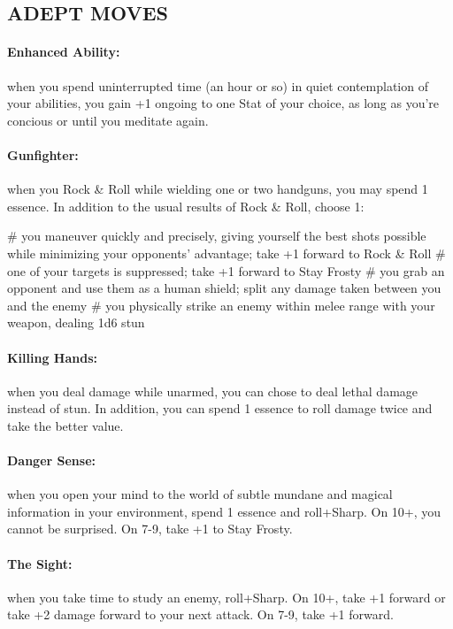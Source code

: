 \subsection{ADEPT MOVES}
\paragraph{Enhanced Ability:} when you spend uninterrupted time (an hour or so) in quiet contemplation of your abilities, you gain +1 ongoing to one Stat of your choice, as long as you’re concious or until you meditate again.

\paragraph{Gunfighter:} when you Rock \& Roll while wielding one or two handguns, you may spend 1 essence. In addition to the usual results of Rock \& Roll, choose 1:
    \begin{easylist}
    # you maneuver quickly and precisely, giving yourself the best shots possible while minimizing your opponents’ advantage; take +1 forward to Rock \& Roll
    # one of your targets is suppressed; take +1 forward to Stay Frosty
    # you grab an opponent and use them as a human shield; split any damage taken between you and the enemy
    # you physically strike an enemy within melee range with your weapon, dealing 1d6 stun
    \end{easylist}

\paragraph{Killing Hands:} when you deal damage while unarmed, you can chose to deal lethal damage instead of stun. In addition, you can spend 1 essence to roll damage twice and take the better value.

\paragraph{Danger Sense:} when you open your mind to the world of subtle mundane and magical information in your environment, spend 1 essence and roll+Sharp. On 10+, you cannot be surprised. On 7-9, take +1 to Stay Frosty.

\paragraph{The Sight:} when you take time to study an enemy, roll+Sharp. On 10+, take +1 forward or take +2 damage forward to your next attack. On 7-9, take +1 forward.

